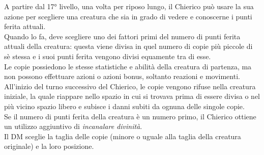 A partire dal 17° livello, una volta per riposo lungo, il Chierico può usare la sua azione per scegliere una creatura che sia in grado di vedere e conoscerne i punti ferita attuali. \\ Quando lo fa, deve scegliere uno dei fattori primi del numero di punti ferita attuali della creatura: questa viene divisa in quel numero di copie più piccole di sè stessa e i suoi punti ferita vengono divisi equamente tra di esse. \\ Le copie possiedono le stesse statistiche e abilità della creatura di partenza, ma non possono effettuare azioni o azioni bonus, soltanto reazioni e movimenti.\\ All'inizio del turno successivo del Chierico, le copie vengono rifuse nella creatura iniziale, la quale riappare nello spazio in cui si trovava prima di essere divisa o nel più vicino spazio libero e subisce i danni subiti da ognuna delle singole copie. \\ Se il numero di punti ferita della creatura è un numero primo, il Chierico ottiene un utilizzo aggiuntivo di \textit{incanalare divinità}. \\ Il DM sceglie la taglia delle copie (minore o uguale alla taglia della creatura originale) e la loro posizione.
